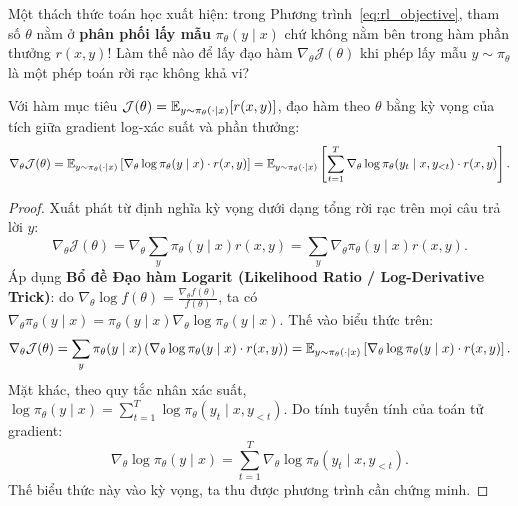 Một thách thức toán học xuất hiện: trong Phương trình~\eqref{eq:rl_objective}, tham số $\theta$ nằm ở \textbf{phân phối lấy mẫu} $\pi_\theta(y \mid x)$ chứ không nằm bên trong hàm phần thưởng $r(x, y)$! Làm thế nào để lấy đạo hàm $\nabla_\theta \mathcal{J}(\theta)$ khi phép lấy mẫu $y \sim \pi_\theta$ là một phép toán rời rạc không khả vi?

\begin{theorem}
\label{thm:policy_gradient}
Với hàm mục tiêu $\mathcal{J}(\theta) = \operatorname{\mathbb{E}}_{y \sim \pi_\theta(\cdot \mid x)} [r(x, y)]$, đạo hàm theo $\theta$ bằng kỳ vọng của tích giữa gradient log-xác suất và phần thưởng:
\begin{equation}
    \nabla_\theta \mathcal{J}(\theta) = \operatorname{\mathbb{E}}_{y \sim \pi_\theta(\cdot \mid x)} \left[ \nabla_\theta \log \pi_\theta(y \mid x) \cdot r(x, y) \right] = \operatorname{\mathbb{E}}_{y \sim \pi_\theta(\cdot \mid x)} \left[ \sum_{t=1}^{T} \nabla_\theta \log \pi_\theta(y_t \mid x, y_{<t}) \cdot r(x, y) \right].
    \label{eq:reinforce_llm}
\end{equation}
\end{theorem}

\begin{proof}
Xuất phát từ định nghĩa kỳ vọng dưới dạng tổng rời rạc trên mọi câu trả lời $y$:
\begin{equation}
    \nabla_\theta \mathcal{J}(\theta) = \nabla_\theta \sum_{y} \pi_\theta(y \mid x) r(x, y) = \sum_{y} \nabla_\theta \pi_\theta(y \mid x) r(x, y).
\end{equation}
Áp dụng \textbf{Bổ đề Đạo hàm Logarit (Likelihood Ratio / Log-Derivative Trick)}: do $\nabla_\theta \log f(\theta) = \frac{\nabla_\theta f(\theta)}{f(\theta)}$, ta có $\nabla_\theta \pi_\theta(y \mid x) = \pi_\theta(y \mid x) \nabla_\theta \log \pi_\theta(y \mid x)$. Thế vào biểu thức trên:
\begin{equation}
    \nabla_\theta \mathcal{J}(\theta) = \sum_{y} \pi_\theta(y \mid x) \left( \nabla_\theta \log \pi_\theta(y \mid x) \cdot r(x, y) \right) = \operatorname{\mathbb{E}}_{y \sim \pi_\theta(\cdot \mid x)} \left[ \nabla_\theta \log \pi_\theta(y \mid x) \cdot r(x, y) \right].
\end{equation}
Mặt khác, theo quy tắc nhân xác suất, $\log \pi_\theta(y \mid x) = \sum_{t=1}^{T} \log \pi_\theta(y_t \mid x, y_{<t})$. Do tính tuyến tính của toán tử gradient:
\begin{equation}
    \nabla_\theta \log \pi_\theta(y \mid x) = \sum_{t=1}^{T} \nabla_\theta \log \pi_\theta(y_t \mid x, y_{<t}).
\end{equation}
Thế biểu thức này vào kỳ vọng, ta thu được phương trình cần chứng minh.
\end{proof}

